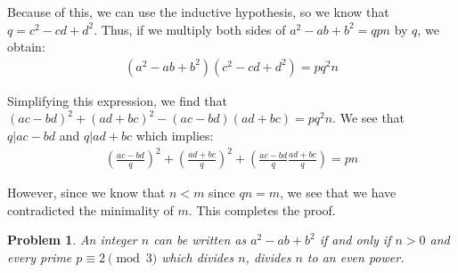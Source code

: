 \documentclass[psamsfonts]{amsart}
\newtheorem{prob}{Problem}[section]
\newenvironment{sol}{{\bfseries Solution}}{\qedsymbol}
\theoremstyle{definition}
\theoremstyle{remark}
\numberwithin{equation}{section}
\begin{document}
\begin{sol}
Because of this, we can use the inductive hypothesis, so we know that $q = c^2 - cd + d^2$. Thus, if we multiply both sides of $a^2 - ab + b^2 = q p n$ by $q$, we obtain:
\begin{eqnarray}
(a^2 - ab + b^2)(c^2 - cd + d^2) = p q^2 n
\end{eqnarray}

Simplifying this expression, we find that $(ac - bd)^2 + (ad + bc)^2 - (ac-bd)(ad+bc) = pq^2 n$. We see that $q | ac - bd$ and $q | ad + bc$ which implies:
\begin{eqnarray}
\left( \frac{ac - bd}{q} \right)^2 + \left( \frac{ad + bc}{q} \right)^2 + \left( \frac{ac - bd}{q} \frac{ad + bc}{q} \right) = pn
\end{eqnarray}

However, since we know that $n < m$ since $qn = m$, we see that we have contradicted the minimality of $m$. This completes the proof.
\end{sol}

\begin{prob}
An integer $n$ can be written as $a^2 - ab + b^2$ if and only if $n > 0$ and every prime $p \equiv 2 \pmod{3}$ which divides $n$, divides $n$ to an even power.
\end{prob}
\end{document}
